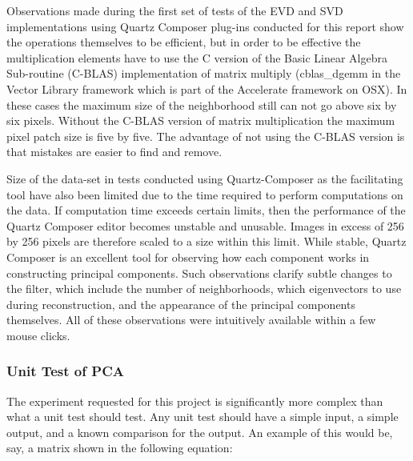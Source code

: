 \documentclass[11pt]{article}
\begin{document}
Observations made during the first set of tests of the EVD and SVD implementations using Quartz Composer plug-ins %
conducted for this report show the operations themselves to be efficient, but in order to be effective the multiplication elements have to use the C version of the Basic Linear Algebra Sub-routine (C-BLAS) implementation of matrix multiply (cblas\_dgemm in the Vector Library framework which is part of the Accelerate framework on OSX). In these cases the maximum size of the neighborhood still can not go above six by six pixels.  Without the  C-BLAS version of matrix multiplication the maximum pixel patch size is five by five.   The advantage of not using the C-BLAS version is that mistakes are easier to find and remove.  

Size of the data-set in tests conducted using Quartz-Composer as the facilitating tool have also been limited due to the time required to perform computations on the data.  If computation time exceeds certain limits, then the performance of the Quartz Composer editor becomes unstable and unusable.  Images in excess of 256 by 256 pixels are therefore scaled to a size within this limit.  %
While stable, Quartz Composer is an excellent tool for observing how each component works in constructing principal components.  Such observations clarify subtle changes to the filter, which include  the number of neighborhoods, which eigenvectors to use during reconstruction, and the appearance of the principal components themselves.  All of these observations were intuitively available within a few mouse clicks.  


\subsubsection{Unit Test of PCA}
The experiment requested for this project is significantly more complex than what a unit test should test.  Any unit test should have a simple input, a simple output, and a known comparison for the output.   An example of this would be, say, a matrix shown in the following equation:  
\end{document}

